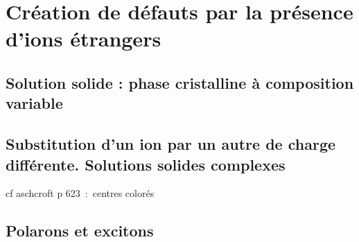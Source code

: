 \chapter{Création de défauts par la présence d'ions étrangers}

\section{Solution solide : phase cristalline à composition variable}


\section{Substitution d'un ion par un autre de charge différente. Solutions solides complexes}

cf aschcroft p 623 : centres colorés

\section{Polarons et excitons}
